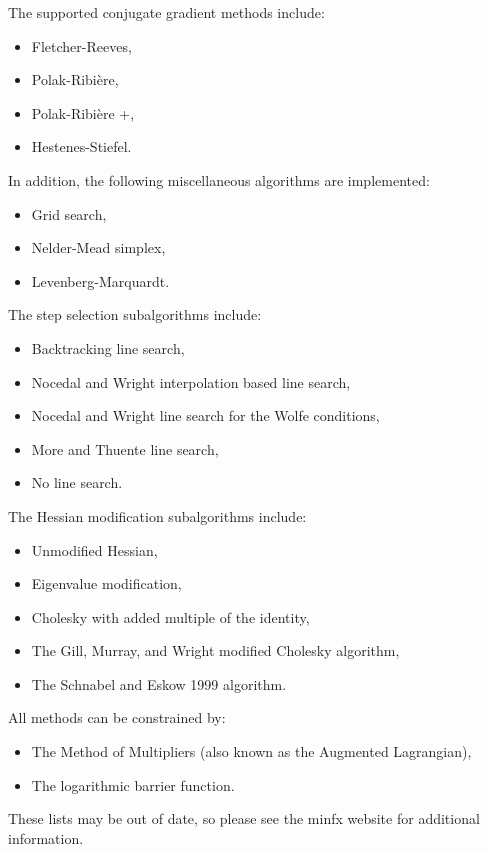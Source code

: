 The supported conjugate gradient methods include:
\begin{itemize}
  \item Fletcher-Reeves,
  \item Polak-Ribi\`ere,
  \item Polak-Ribi\`ere +,
  \item Hestenes-Stiefel.
\end{itemize}

In addition, the following miscellaneous algorithms are implemented:
\begin{itemize}
  \item Grid search,
  \item Nelder-Mead simplex,
  \item Levenberg-Marquardt.
\end{itemize}

The step selection subalgorithms include:
\begin{itemize}
  \item Backtracking line search,
  \item Nocedal and Wright interpolation based line search,
  \item Nocedal and Wright line search for the Wolfe conditions,
  \item More and Thuente line search,
  \item No line search.
\end{itemize}

The Hessian modification subalgorithms include: 
\begin{itemize}
  \item Unmodified Hessian,
  \item Eigenvalue modification,
  \item Cholesky with added multiple of the identity,
  \item The Gill, Murray, and Wright modified Cholesky algorithm,
  \item The Schnabel and Eskow 1999 algorithm.
\end{itemize}

All methods can be constrained by:
\begin{itemize}
  \item The Method of Multipliers (also known as the Augmented Lagrangian),
  \item The logarithmic barrier function.
\end{itemize}

These lists may be out of date, so please see the minfx website for additional information.



